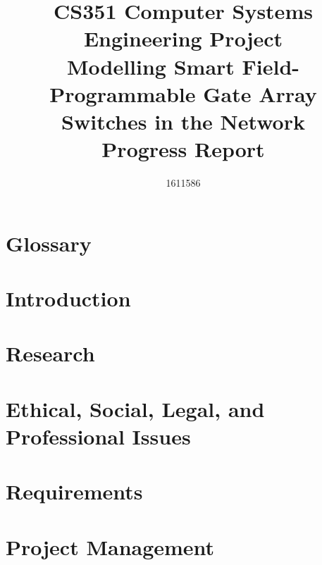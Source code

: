 \documentclass[
  12pt,
  a4paper,
  twoside,
  onecolumn,
  appendixprefix=true,
  toc=chapterentrywithdots,
  toc=bibliography,
  abstract=true,
  toc=listof
]{scrreprt}
\title{CS351 Computer Systems Engineering Project \\ \vspace{0.5cm} Modelling Smart Field-Programmable Gate Array Switches in the Network \\ \vspace{0.3cm} \Large{Progress Report}}
\author{1611586}
\begin{document}
\renewcommand{\sfdefault}{cmr}




\onehalfspacing
{}

{}


\newpage

{}
\chapter*{Glossary}
\label{glossary}


\tableofcontents

\listoffigures

\listoftables

\newpage


\chapter{Introduction}
\label{introduction}


\chapter{Research}
\label{research}


\chapter{Ethical, Social, Legal, and Professional Issues}
\label{issues}


\chapter{Requirements}
\label{requirements}


\chapter{Project Management}
\label{project_management}

\end{document}
